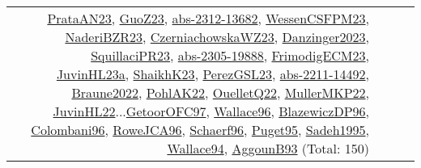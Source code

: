 {\begin{longtable}{p{3cm}r>{\raggedright\arraybackslash}p{6cm}>{\raggedright\arraybackslash}p{6cm}>{\raggedright\arraybackslash}p{8cm}}
& \hyperref[detail:PrataAN23]{PrataAN23}, \hyperref[detail:GuoZ23]{GuoZ23}, \hyperref[detail:abs-2312-13682]{abs-2312-13682}, \hyperref[detail:WessenCSFPM23]{WessenCSFPM23}, \hyperref[detail:NaderiBZR23]{NaderiBZR23}, \hyperref[detail:CzerniachowskaWZ23]{CzerniachowskaWZ23}, \hyperref[detail:Danzinger2023]{Danzinger2023}, \hyperref[detail:SquillaciPR23]{SquillaciPR23}, \hyperref[detail:abs-2305-19888]{abs-2305-19888}, \hyperref[detail:FrimodigECM23]{FrimodigECM23}, \hyperref[detail:JuvinHL23a]{JuvinHL23a}, \hyperref[detail:ShaikhK23]{ShaikhK23}, \hyperref[detail:PerezGSL23]{PerezGSL23}, \hyperref[detail:abs-2211-14492]{abs-2211-14492}, \hyperref[detail:Braune2022]{Braune2022}, \hyperref[detail:PohlAK22]{PohlAK22}, \hyperref[detail:OuelletQ22]{OuelletQ22}, \hyperref[detail:MullerMKP22]{MullerMKP22}, \hyperref[detail:JuvinHL22]{JuvinHL22}...\hyperref[detail:GetoorOFC97]{GetoorOFC97}, \hyperref[detail:Wallace96]{Wallace96}, \hyperref[detail:BlazewiczDP96]{BlazewiczDP96}, \hyperref[detail:Colombani96]{Colombani96}, \hyperref[detail:RoweJCA96]{RoweJCA96}, \hyperref[detail:Schaerf96]{Schaerf96}, \hyperref[detail:Puget95]{Puget95}, \hyperref[detail:Sadeh1995]{Sadeh1995}, \hyperref[detail:Wallace94]{Wallace94}, \hyperref[detail:AggounB93]{AggounB93} (Total: 150)\\

\end{longtable}}
